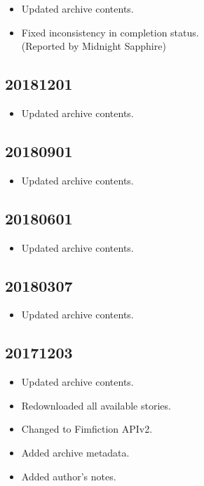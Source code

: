 \documentclass[hidelinks,a4paper,12pt]{article}
\begin{document}
\begin{itemize}
\item Updated archive contents.
\item Fixed inconsistency in completion status.
  \\ (Reported by Midnight Sapphire)
\end{itemize}

\subsection{20181201}  \label{sec:changelog_20181201}

\begin{itemize}
\item Updated archive contents.
\end{itemize}

\subsection{20180901}  \label{sec:changelog_20180901}

\begin{itemize}
\item Updated archive contents.
\end{itemize}

\subsection{20180601}  \label{sec:changelog_20180601}

\begin{itemize}
\item Updated archive contents.
\end{itemize}

\subsection{20180307}  \label{sec:changelog_20180307}

\begin{itemize}
\item Updated archive contents.
\end{itemize}

\subsection{20171203}  \label{sec:changelog_20171203}

\begin{itemize}
\item Updated archive contents.
\item Redownloaded all available stories.
\item Changed to Fimfiction APIv2.
\item Added archive metadata.
\item Added author's notes.
\end{itemize}
\end{document}
